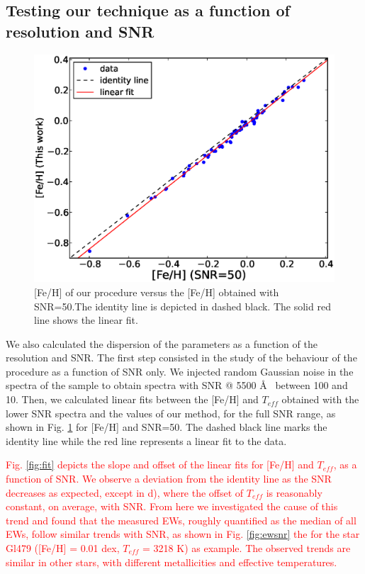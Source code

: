 \documentclass{aa}
\begin{document}
\subsection{Testing our technique as a function of resolution and SNR}
\label{sec:testcal}

\begin{figure}[]
\begin{center}
\includegraphics[scale=0.40]{pics/fehfehsnr.eps}
\end{center}
\caption{[Fe/H] of our procedure versus the [Fe/H] obtained with SNR=50.The identity line is depicted in dashed black. The solid red line shows the linear fit.}
\label{fig:fehfehsnr}
\end{figure}



We also calculated the dispersion of the parameters as a function of the resolution and SNR. The first step consisted in the study of the behaviour of the procedure as a function of SNR only. We injected random Gaussian noise in the spectra of the sample to obtain spectra with SNR @ 5500 \AA~ between 100 and 10. Then, we calculated linear fits between the [Fe/H] and $T_{eff}$ obtained with the lower SNR spectra and the values of our method, for the full SNR range, as shown in Fig. \ref{fig:fehfehsnr} for [Fe/H] and SNR=50. The dashed black line marks the identity line while the red line represents a linear fit to the data. 



\textcolor{red}{Fig. \ref{fig:fit} depicts the slope and offset of the linear fits for [Fe/H] and $T_{eff}$, as a function of SNR. We observe a deviation from the identity line as the SNR decreases as expected, except in d), where the offset of $T_{eff}$ is reasonably constant, on average, with SNR. From here we investigated the cause of this trend and found that the measured EWs, roughly quantified as the median of all EWs, follow similar trends with SNR, as shown in Fig. \ref{fig:ewsnr} the for the star Gl479 ([Fe/H] = 0.01 dex, $T_{eff}$ = 3218 K) as example. The observed trends are similar in other stars, with different metallicities and effective temperatures.}
\end{document}

